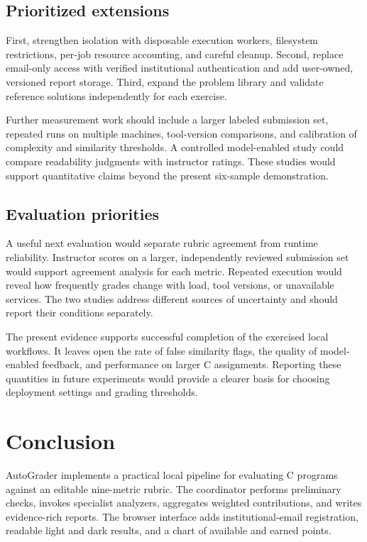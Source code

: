 \documentclass[conference]{IEEEtran}
\begin{document}
\subsection{Prioritized extensions}

First, strengthen isolation with disposable execution workers, filesystem restrictions, per-job resource accounting, and careful cleanup. Second, replace email-only access with verified institutional authentication and add user-owned, versioned report storage. Third, expand the problem library and validate reference solutions independently for each exercise.


Further measurement work should include a larger labeled submission set, repeated runs on multiple machines, tool-version comparisons, and calibration of complexity and similarity thresholds. A controlled model-enabled study could compare readability judgments with instructor ratings. These studies would support quantitative claims beyond the present six-sample demonstration.


\subsection{Evaluation priorities}

A useful next evaluation would separate rubric agreement from runtime reliability. Instructor scores on a larger, independently reviewed submission set would support agreement analysis for each metric. Repeated execution would reveal how frequently grades change with load, tool versions, or unavailable services. The two studies address different sources of uncertainty and should report their conditions separately.


The present evidence supports successful completion of the exercised local workflows. It leaves open the rate of false similarity flags, the quality of model-enabled feedback, and performance on larger C assignments. Reporting these quantities in future experiments would provide a clearer basis for choosing deployment settings and grading thresholds.


\newpage

\section{Conclusion}

AutoGrader implements a practical local pipeline for evaluating C programs against an editable nine-metric rubric. The coordinator performs preliminary checks, invokes specialist analyzers, aggregates weighted contributions, and writes evidence-rich reports. The browser interface adds institutional-email registration, readable light and dark results, and a chart of available and earned points.
\end{document}
